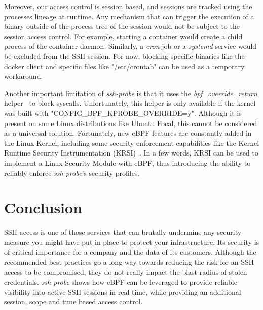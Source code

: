 Moreover, our access control is session based, and sessions are tracked using the processes lineage at runtime.
Any mechanism that can trigger the execution of a binary outside of the process tree of the session would not be subject to the session access control.
For example, starting a container would create a child process of the container daemon.
Similarly, a \emph{cron} job or a \emph{systemd} service would be excluded from the SSH session.
For now, blocking specific binaries like the docker client and specific files like "/etc/crontab" can be used as a temporary workaround.

Another important limitation of \emph{ssh-probe} is that it uses the \emph{bpf\_override\_return} helper~\cite{MonitoringAndProtectingSSHSessionsWithEBPF:OverrideReturn} to block syscalls.
Unfortunately, this helper is only available if the kernel was built with "CONFIG\_BPF\_KPROBE\_OVERRIDE=y".
Although it is present on some Linux distributions like Ubuntu Focal, this cannot be considered as a universal solution.
Fortunately, new eBPF features are constantly added in the Linux Kernel,
including some security enforcement capabilities like the Kernel Runtime Security Instrumentation (KRSI)~\cite{MonitoringAndProtectingSSHSessionsWithEBPF:KRSI}.
In a few words, KRSI can be used to implement a Linux Security Module with eBPF, thus introducing the ability to reliably enforce \emph{ssh-probe}’s security profiles.

\section{Conclusion}

SSH access is one of those services that can brutally undermine any security measure you might have put in place to protect your infrastructure.
Its security is of critical importance for a company and the data of its customers.
Although the recommended best practices go a long way towards reducing the risk for an SSH access to be compromised, they do not really impact the blast radius of stolen credentials.
\emph{ssh-probe} shows how eBPF can be leveraged to provide reliable visibility into active SSH sessions in real-time, while providing an additional session, scope and time based access control.



%
%
